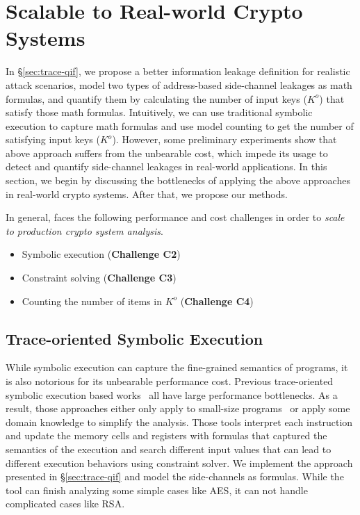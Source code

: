 \section{Scalable to Real-world Crypto Systems}

In \S\ref{sec:trace-qif}, we propose a better information leakage definition
for realistic attack scenarios, model two types of address-based side-channel
leakages
as math formulas, and quantify them by calculating the number of input
keys ($K^o$) that satisfy those math formulas. Intuitively, we can use
traditional symbolic execution to capture math formulas and use model
counting to get the number of satisfying input keys ($K^o$).
However, some preliminary experiments show that above approach suffers from the unbearable cost, 
which impede its usage
to detect and quantify side-channel leakages in real-world applications. 
In this section, we begin by discussing the bottlenecks of applying the 
above approaches in real-world crypto systems. After that, we propose
our methods.

In general, \tool{} faces the following performance and cost  challenges
in order to \emph{scale to production crypto system analysis}. 
\begin{itemize}
    \item Symbolic execution (\textbf{Challenge C2})
    \item Constraint solving (\textbf{Challenge C3})
    \item Counting the number of items in $K^o$ (\textbf{Challenge C4})
\end{itemize}

\subsection{Trace-oriented Symbolic Execution}
While symbolic execution can capture the fine-grained semantics of programs,
it is also notorious for its unbearable performance cost. Previous 
trace-oriented symbolic execution based
works~\cite{203878,Chattopadhyay:2017:QIL:3127041.3127044} all 
have large performance bottlenecks. As a result, those approaches 
either only apply to small-size programs~\cite{Chattopadhyay:2017:QIL:3127041.3127044} 
or apply some domain knowledge to simplify the analysis.
Those tools interpret each instruction and update the memory cells and registers with
formulas that captured the semantics of the execution and search different 
input values that can lead to different execution behaviors using constraint solver.
We implement the approach presented in \S\ref{sec:trace-qif} and
model the side-channels as formulas.
While the tool can finish analyzing some simple cases like AES, 
it can not handle complicated cases like RSA. 

